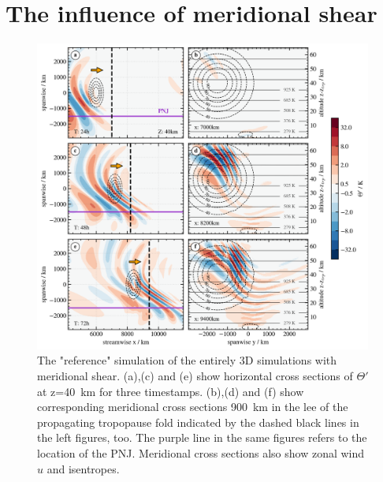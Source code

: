 \section{The influence of meridional shear}
\begin{figure}[tbp]
    \centering
    \includegraphics[width=0.99\textwidth]{figures_3D/3D-th-referenceSim.png}
    \caption{The "reference" simulation of the entirely 3D simulations with meridional shear. (a),(c) and (e) show horizontal cross sections of $\Theta'$ at z=\SI{40}{\kilo\meter} for three timestamps. (b),(d) and (f) show corresponding meridional cross sections \SI{900}{\kilo\meter} in the lee of the propagating tropopause fold indicated by the dashed black lines in the left figures, too. The purple line in the same figures refers to the location of the PNJ. Meridional cross sections also show zonal wind $u$ and isentropes.}
    \label{fig:3D-reference}
\end{figure}


